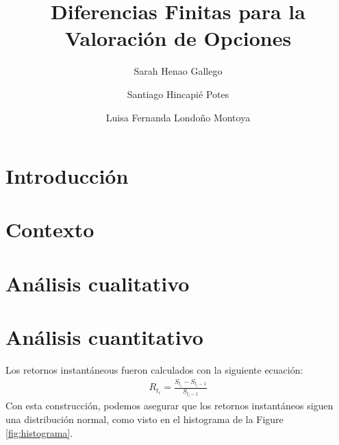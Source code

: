 \documentclass[]{elsarticle}
\begin{document}
\begin{frontmatter}

\title{Diferencias Finitas para la Valoración de Opciones}

\author{Sarah Henao Gallego}

\author{Santiago Hincapié Potes}

\author{Luisa Fernanda Londoño Montoya}

\address{Universidad EAFIT, Medellín--Colombia.}

\begin{abstract}
\end{abstract}

\begin{keyword}
\end{keyword}

\end{frontmatter}

\section{Introducción}
\label{sec:intro}


\section{Contexto}
\label{sec:context}


\section{Análisis cualitativo}
\label{sec:qualitative_an}


\section{Análisis cuantitativo}
\label{sec:quantitative_an}



Los retornos instantáneous fueron calculados con la siguiente ecuación: 
\begin{align}
R_{t_i} = \frac{S_{t_i}-S_{t_i-1}}{S_{t_i-1}}
\end{align}
Con esta construcción, podemos asegurar que los retornos instantáneos siguen una distribución normal, como visto en el histograma de la Figure \ref{fig:histograma}. 
\end{document}
